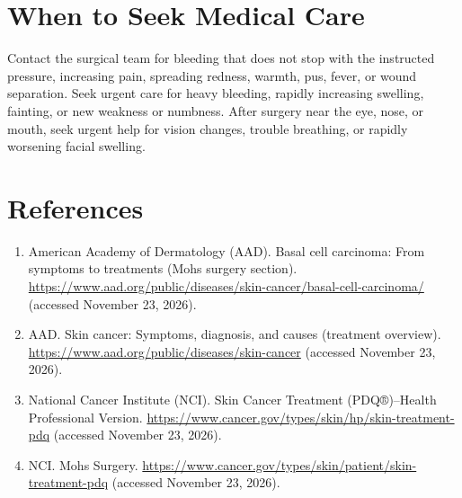 \section*{When to Seek Medical Care}
Contact the surgical team for bleeding that does not stop with the instructed pressure, increasing pain, spreading redness, warmth, pus, fever, or wound separation. Seek urgent care for heavy bleeding, rapidly increasing swelling, fainting, or new weakness or numbness. After surgery near the eye, nose, or mouth, seek urgent help for vision changes, trouble breathing, or rapidly worsening facial swelling.

\section*{References}
\begin{enumerate}
  \item American Academy of Dermatology (AAD). Basal cell carcinoma: From symptoms to treatments (Mohs surgery section). \url{https://www.aad.org/public/diseases/skin-cancer/basal-cell-carcinoma/} (accessed November 23, 2026).
  \item AAD. Skin cancer: Symptoms, diagnosis, and causes (treatment overview). \url{https://www.aad.org/public/diseases/skin-cancer} (accessed November 23, 2026).
  \item National Cancer Institute (NCI). Skin Cancer Treatment (PDQ®)–Health Professional Version. \url{https://www.cancer.gov/types/skin/hp/skin-treatment-pdq} (accessed November 23, 2026).
  \item NCI. Mohs Surgery. \url{https://www.cancer.gov/types/skin/patient/skin-treatment-pdq} (accessed November 23, 2026).
\end{enumerate}

\clearpage

